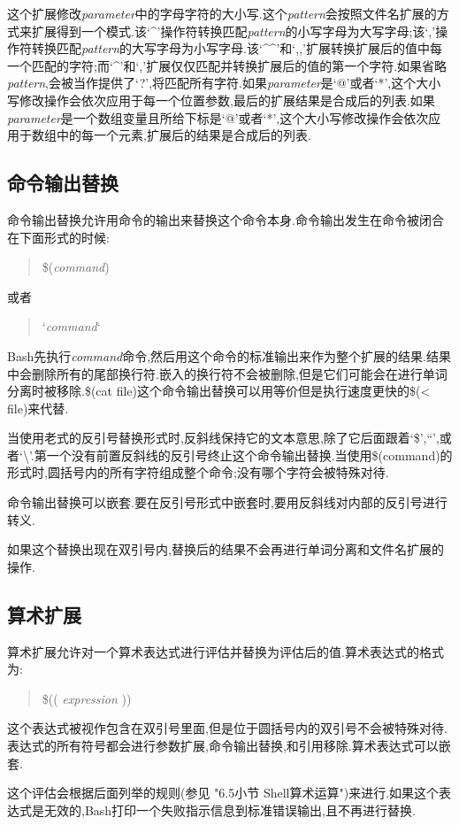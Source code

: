 \documentclass[draft,openany]{book}
\begin{document}
\begin{CJK}{UTF8}{gbsn}
\begin{basedescript}{\desclabelstyle{\nextlinelabel}\desclabelwidth{2.5em}}
        这个扩展修改\emph{parameter}中的字母字符的大小写.这个\emph{pattern}会按照文件名扩展的方式来扩展得到一个模式.该`\^{}'操作符转换匹配\emph{pattern}的小写字母为大写字母;该`,'操作符转换匹配\emph{pattern}的大写字母为小写字母.该`\^{}\^{}'和`,,'扩展转换扩展后的值中每一个匹配的字符;而`\^{}'和`,'扩展仅仅匹配并转换扩展后的值的第一个字符.如果省略\emph{pattern},会被当作提供了`?',将匹配所有字符.如果\emph{parameter}是`@'或者`*',这个大小写修改操作会依次应用于每一个位置参数,最后的扩展结果是合成后的列表.如果\emph{parameter}是一个数组变量且所给下标是`@'或者`*',这个大小写修改操作会依次应用于数组中的每一个元素,扩展后的结果是合成后的列表.
    \end{basedescript}

    \subsection{命令输出替换}
    命令输出替换允许用命令的输出来替换这个命令本身.命令输出发生在命令被闭合
    在下面形式的时候:
    \begin{quote}
        \$(\emph{command})
    \end{quote}
    或者
    \begin{quote}
        `\emph{command}`
    \end{quote}
    Bash先执行\emph{command}命令,然后用这个命令的标准输出来作为整个扩展的结果.结果中会删除所有的尾部换行符.嵌入的换行符不会被删除,但是它们可能会在进行单词分离时被移除.\$(cat file)这个命令输出替换可以用等价但是执行速度更快的\$(< file)来代替.\par
    当使用老式的反引号替换形式时,反斜线保持它的文本意思,除了它后面跟着`\$',``',或者`\textbackslash'.第一个没有前置反斜线的反引号终止这个命令输出替换.当使用\$(command)的形式时,圆括号内的所有字符组成整个命令;没有哪个字符会被特殊对待.\par
    命令输出替换可以嵌套.要在反引号形式中嵌套时,要用反斜线对内部的反引号进行转义.\par
    如果这个替换出现在双引号内,替换后的结果不会再进行单词分离和文件名扩展的操作.

    \subsection{算术扩展}
    算术扩展允许对一个算术表达式进行评估并替换为评估后的值.算术表达式的格式为:
    \begin{quote}
        \$(( \emph{expression} ))
    \end{quote}
    这个表达式被视作包含在双引号里面,但是位于圆括号内的双引号不会被特殊对待.表达式的所有符号都会进行参数扩展,命令输出替换,和引用移除.算术表达式可以嵌套.\par
    这个评估会根据后面列举的规则(参见 "6.5小节 Shell算术运算")来进行.如果这个表达式是无效的,Bash打印一个失败指示信息到标准错误输出,且不再进行替换.


\end{CJK}
\end{document}
